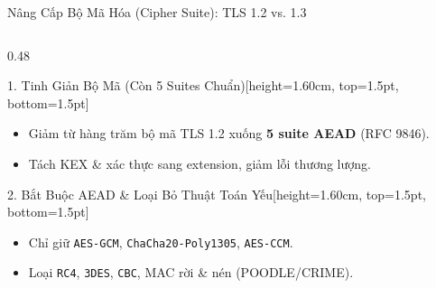 \documentclass[aspectratio=169, 10pt]{beamer}
\begin{document}
\begin{frame}{Nâng Cấp Bộ Mã Hóa (Cipher Suite): TLS 1.2 vs. 1.3}
\begin{uetcard}[height=1.82cm, valign=center, top=1.5pt, bottom=1.5pt, left=4pt, right=4pt, sharp corners, arc=0pt]
	\end{uetcard}

	\vspace{0.05cm}
	\begin{columns}[T]
		\begin{column}{0.48\textwidth}
			\begin{accentcard}[uetblue]{1. Tinh Giản Bộ Mã (Còn 5 Suites Chuẩn)}[height=1.60cm, top=1.5pt, bottom=1.5pt]
				\begin{itemize}\setlength{\itemsep}{0.35pt}\setlength{\topsep}{0pt}\fontsize{6.2pt}{7.4pt}\selectfont
					\item Giảm từ hàng trăm bộ mã TLS 1.2 xuống \textbf{5 suite AEAD} (RFC 9846).
					\item Tách KEX \& xác thực sang extension, giảm lỗi thương lượng.
				\end{itemize}
			\end{accentcard}
			\vspace{0.05cm}
			\begin{accentcard}[uetblue]{2. Bắt Buộc AEAD \& Loại Bỏ Thuật Toán Yếu}[height=1.60cm, top=1.5pt, bottom=1.5pt]
				\begin{itemize}\setlength{\itemsep}{0.35pt}\setlength{\topsep}{0pt}\fontsize{6.2pt}{7.4pt}\selectfont
					\item Chỉ giữ \texttt{AES-GCM}, \texttt{ChaCha20-Poly1305}, \texttt{AES-CCM}.
					\item Loại \texttt{RC4}, \texttt{3DES}, \texttt{CBC}, MAC rời \& nén (POODLE/CRIME).
				\end{itemize}
			\end{accentcard}
		\end{column}


\end{columns}
\end{frame}
\end{document}
